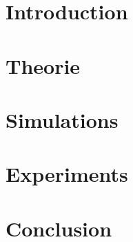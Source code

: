 \documentclass[12pt]{article}
\begin{document}
\newpage

\section{Introduction}

\section{Theorie}

\section{Simulations}

\section{Experiments}

\section{Conclusion}
\end{document}
